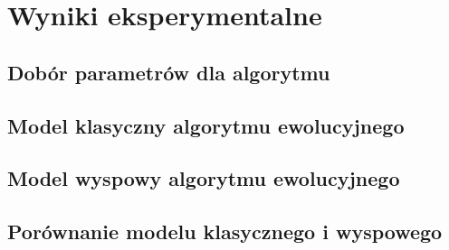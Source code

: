 \chapter{Wyniki eksperymentalne}
\thispagestyle{chapterBeginStyle}

\section{Dobór parametrów dla algorytmu}

\section{Model klasyczny algorytmu ewolucyjnego}

\section{Model wyspowy algorytmu ewolucyjnego}

\section{Porównanie modelu klasycznego i wyspowego}